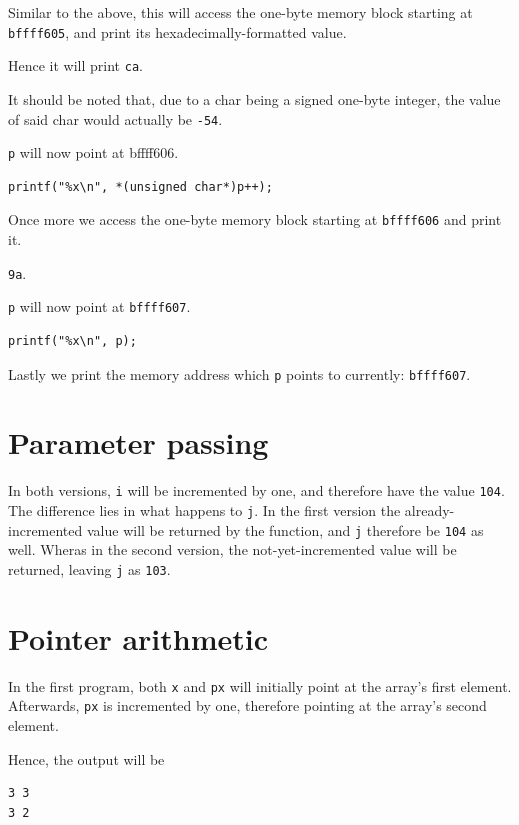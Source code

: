 \documentclass[a4paper]{scrartcl}
\begin{document}
Similar to the above, this will access the one-byte memory block starting at
\texttt{bffff605}, and print its hexadecimally-formatted value.

Hence it will print \texttt{ca}.

It should be noted that, due to a char being a signed one-byte integer, the
value of said char would actually be \texttt{-54}. 

\texttt{p} will now point at {bffff606}.

\begin{lstlisting}
printf("%x\n", *(unsigned char*)p++);
\end{lstlisting}

Once more we access the one-byte memory block starting at \texttt{bffff606} and
print it.

\texttt{9a}.

\texttt{p} will now point at \texttt{bffff607}.

\begin{lstlisting}
printf("%x\n", p);
\end{lstlisting}

Lastly we print the memory address which \texttt{p} points to currently:
\texttt{bffff607}.

\section{Parameter passing}

In both versions, \texttt{i} will be incremented by one, and therefore have the
value \texttt{104}. The difference lies in what happens to \texttt{j}. In the
first version the already-incremented value will be returned by the function,
and \texttt{j} therefore be \texttt{104} as well. Wheras in the second version,
the not-yet-incremented value will be returned, leaving \texttt{j} as
\texttt{103}.

\section{Pointer arithmetic}

In the first program, both \texttt{x} and \texttt{px} will initially point at
the array's first element. Afterwards, \texttt{px} is incremented by one,
therefore pointing at the array's second element.

Hence, the output will be

\begin{lstlisting}
3 3
3 2
\end{lstlisting}
\end{document}
